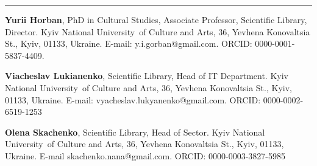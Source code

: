 \begin{center}\rule{0.5\linewidth}{0.5pt}\end{center}

\textbf{Yurii Horban}, PhD in Cultural Studies, Associate Professor,
Scientific Library, Director. Kyiv National University~of Culture and
Arts, 36, Yevhena Konovaltsia St., Kyiv, 01133, Ukraine. E-mail:
y.i.gorban@gmail.com. ORCID: 0000-0001-5837-4409.

\textbf{Viacheslav Lukianenko}, Scientific Library, Head of IT
Department. Kyiv National University~of Culture and Arts, 36, Yevhena
Konovaltsia St., Kyiv, 01133, Ukraine. E-mail:
vyacheslav.lukyanenko@gmail.com. ORCID: 0000-0002-6519-1253

\textbf{Olena Skachenko}, Scientific Library, Head of Sector. Kyiv
National University~of Culture and Arts, 36, Yevhena Konovaltsia St.,
Kyiv, 01133, Ukraine. E-mail skachenko.nana@gmail.com. ORCID:
0000-0003-3827-5985
